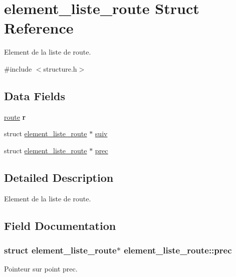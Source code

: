 \hypertarget{structelement__liste__route}{}\section{element\+\_\+liste\+\_\+route Struct Reference}
\label{structelement__liste__route}


Element de la liste de route.  




{\ttfamily \#include $<$structure.\+h$>$}

\subsection*{Data Fields}
\begin{DoxyCompactItemize}
\item 
\hyperlink{structroute}{route} {\bfseries r}\hypertarget{structelement__liste__route_ae7389fedb5c1856495f46413d3093534}{}\label{structelement__liste__route_ae7389fedb5c1856495f46413d3093534}

\item 
struct \hyperlink{structelement__liste__route}{element\+\_\+liste\+\_\+route} $\ast$ \hyperlink{structelement__liste__route_a9a5f54b2de65d5430f34726eb208fd72}{suiv}
\item 
struct \hyperlink{structelement__liste__route}{element\+\_\+liste\+\_\+route} $\ast$ \hyperlink{structelement__liste__route_a27af1578f982952bd95de29e0b1c1a45}{prec}
\end{DoxyCompactItemize}


\subsection{Detailed Description}
Element de la liste de route. 

\subsection{Field Documentation}
\subsubsection[{\texorpdfstring{prec}{prec}}]{\setlength{\rightskip}{0pt plus 5cm}struct {\bf element\+\_\+liste\+\_\+route}$\ast$ element\+\_\+liste\+\_\+route\+::prec}\hypertarget{structelement__liste__route_a27af1578f982952bd95de29e0b1c1a45}{}\label{structelement__liste__route_a27af1578f982952bd95de29e0b1c1a45}
Pointeur sur point prec. 

